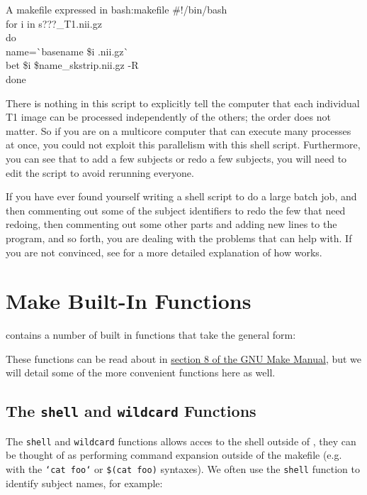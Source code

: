 \begin{bash}{A makefile expressed in \bashn{}}{bash:makefile}
	\#!/bin/bash \\
	for i in s???_T1.nii.gz \\
	do \\
	name=\`{}basename \$i .nii.gz\`{} \\
	bet \$i \${name}_skstrip.nii.gz -R \\
	done
\end{bash}
	
There is nothing in this script to explicitly tell the computer that each individual T1 image can be processed independently of the others; the order does not matter. So if you are on a multicore computer that can execute many processes at once, you could not exploit this parallelism with this shell script. Furthermore, you can see that to add a few subjects or redo a few subjects, you will need to edit the script to avoid rerunning everyone. 
	
If you have ever found yourself writing a shell script to do a large batch job, and then commenting out some of the subject identifiers to redo the few that need redoing, then commenting out some other parts and adding new lines to the program, and so forth, you are dealing with the problems that \maken{} can help with. If you are not convinced, see  for a more detailed explanation of how \maken{} works. 

\section{Make Built-In Functions}

\maken{} contains a number of built in functions that take the general form:


These functions can be read about in \href{https://www.gnu.org/software/make/manual/html_node/Functions.html#Functions}{section 8 of the GNU Make Manual}, but we will detail some of the more convenient functions here as well.

\subsection{The \texttt{shell} and \texttt{wildcard} Functions}

The \texttt{shell} and \texttt{wildcard} functions allows acces to the shell outside of \maken{}, they can be thought of as performing command expansion outside of the makefile (e.g. with the \texttt{`cat foo`} or \texttt{\$(cat foo)} syntaxes). We often use the \texttt{shell} function to identify subject names, for example:

